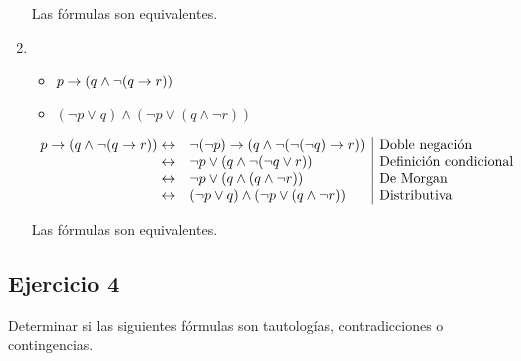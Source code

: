 \begin{enumerate}[label=\alph*)]
            Las fórmulas son equivalentes.
      \item
            \begin{itemize}
                  \item $p \rightarrow (q \land \neg (q \rightarrow r))$
                  \item $(\neg p \lor q) \land (\neg p \lor (q \land \neg r))$
            \end{itemize}

            \[
                  \begin{array}{rl|l}
                        p \rightarrow (q \land \neg (q \rightarrow r)) \leftrightarrow & \neg (\neg p) \rightarrow (q \land \neg (\neg (\neg q) \rightarrow r)) & \text{Doble negación}         \\
                        \leftrightarrow                                    & \neg p \lor (q \land \neg (\neg q \lor r))                 & \text{Definición condicional} \\
                        \leftrightarrow                                    & \neg p \lor (q \land (q \land \neg r))                     & \text{De Morgan}              \\
                        \leftrightarrow                                    & (\neg p \lor q) \land (\neg p \lor (q \land \neg r))       & \text{Distributiva}
                  \end{array}
            \]

            Las fórmulas son equivalentes.
\end{enumerate}

\subsection{Ejercicio 4}
Determinar si las siguientes fórmulas son tautologías, contradicciones o contingencias.

